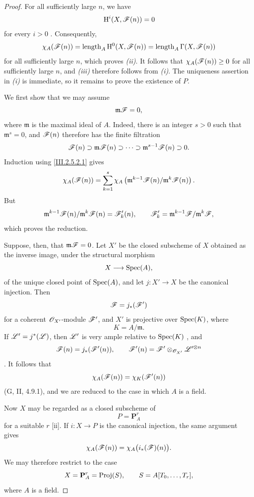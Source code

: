 \begin{proof}
For all sufficiently large $n$, we have
\[
  \mathrm{H}^i(X,\mathscr{F}(n))=0
\]
for every $i>0$ .
Consequently,
\[
  \chi_A(\mathscr{F}(n))
  =
  \operatorname{length}_A\mathrm{H}^0(X,\mathscr{F}(n))
  =
  \operatorname{length}_A\Gamma(X,\mathscr{F}(n))
\]
for all sufficiently large $n$, which proves \emph{(ii)}.
It follows that $\chi_A(\mathscr{F}(n))\geq0$ for all sufficiently large $n$, and \emph{(iii)} therefore follows from \emph{(i)}.
The uniqueness assertion in \emph{(i)} is immediate, so it remains to prove the existence of $P$.

We first show that we may assume
\[
  \mathfrak{m}\mathscr{F}=0,
\]
where $\mathfrak{m}$ is the maximal ideal of $A$.
Indeed, there is an integer $s>0$ such that $\mathfrak{m}^s=0$, and $\mathscr{F}(n)$ therefore has the finite filtration
\[
  \mathscr{F}(n)
  \supset\mathfrak{m}\mathscr{F}(n)
  \supset\cdots
  \supset\mathfrak{m}^{s-1}\mathscr{F}(n)
  \supset0.
\]
Induction using \eqref{III.2.5.2.1} gives
\[
  \chi_A(\mathscr{F}(n))
  =
  \sum_{k=1}^{s}
  \chi_A\left(
    \mathfrak{m}^{k-1}\mathscr{F}(n)/
    \mathfrak{m}^{k}\mathscr{F}(n)
  \right).
\]
But
\[
  \mathfrak{m}^{k-1}\mathscr{F}(n)/
  \mathfrak{m}^{k}\mathscr{F}(n)
  =
  \mathscr{F}'_k(n),
  \qquad
  \mathscr{F}'_k=
  \mathfrak{m}^{k-1}\mathscr{F}/\mathfrak{m}^{k}\mathscr{F},
\]
which proves the reduction.

Suppose, then, that $\mathfrak{m}\mathscr{F}=0$.
Let $X'$ be the closed subscheme of $X$ obtained as the inverse image, under the structural morphism
\[
  X\longrightarrow\operatorname{Spec}(A),
\]
of the unique closed point of $\operatorname{Spec}(A)$, and let $j:X'\to X$ be the canonical injection.
Then
\[
  \mathscr{F}=j_*(\mathscr{F}')
\]
for a coherent $\mathscr{O}_{X'}$-module $\mathscr{F}'$, and $X'$ is projective over $\operatorname{Spec}(K)$, where
\[
  K=A/\mathfrak{m}.
\]
If $\mathscr{L}'=j^*(\mathscr{L})$, then $\mathscr{L}'$ is very ample relative to $\operatorname{Spec}(K)$ , and
\[
  \mathscr{F}(n)=j_*(\mathscr{F}'(n)),
  \qquad
  \mathscr{F}'(n)
  =
  \mathscr{F}'\otimes_{\mathscr{O}_{X'}}\mathscr{L}'^{\otimes n}
\]
.
It follows that
\[
  \chi_A(\mathscr{F}(n))
  =
  \chi_K(\mathscr{F}'(n))
\]
(G, II, 4.9.1), and we are reduced to the case in which $A$ is a field.

Now $X$ may be regarded as a closed subscheme of
\[
  P=\mathbf{P}_A^r
\]
for a suitable $r$ [ii].
If $i:X\to P$ is the canonical injection, the same argument gives
\[
  \chi_A(\mathscr{F}(n))
  =
  \chi_A\bigl(i_*(\mathscr{F})(n)\bigr).
\]
We may therefore restrict to the case
\[
  X=\mathbf{P}_A^r=\operatorname{Proj}(S),
  \qquad
  S=A[T_0,\ldots,T_r],
\]
where $A$ is a field.


\end{proof}
